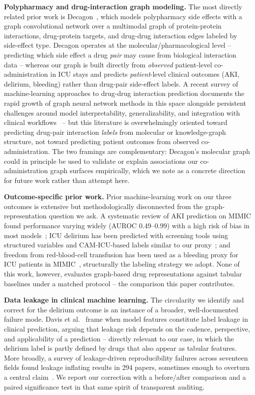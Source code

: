 \documentclass[conference]{IEEEtran}
\begin{document}
\textbf{Polypharmacy and drug-interaction graph modeling.} The most directly
related prior work is Decagon~\cite{zitnik2018decagon}, which models
polypharmacy side effects with a graph convolutional network over a
multimodal graph of protein-protein interactions, drug-protein targets, and
drug-drug interaction edges labeled by side-effect type. Decagon operates at
the molecular/pharmacological level -- predicting which side effect a drug
\emph{pair} may cause from biological interaction data -- whereas our graph
is built directly from \emph{observed} patient-level co-administration in
ICU stays and predicts \emph{patient}-level clinical outcomes (AKI,
delirium, bleeding) rather than drug-pair side-effect labels. A recent
survey of machine-learning approaches to drug-drug interaction prediction
documents the rapid growth of graph neural network methods in this space
alongside persistent challenges around model interpretability,
generalizability, and integration with clinical
workflows~\cite{lu2026ddisurvey} -- but this literature is overwhelmingly
oriented toward predicting drug-pair interaction \emph{labels} from
molecular or knowledge-graph structure, not toward predicting patient
outcomes from observed co-administration. The two framings are
complementary: Decagon's molecular graph could in principle be used to
validate or explain associations our co-administration graph surfaces
empirically, which we note as a concrete direction for future work rather
than attempt here.

\textbf{Outcome-specific prior work.} Prior machine-learning work on our
three outcomes is extensive but methodologically disconnected from the
graph-representation question we ask. A systematic review of AKI prediction
on MIMIC found performance varying widely (AUROC 0.49--0.99) with a high
risk of bias in most models~\cite{vagliano2022akireview}; ICU delirium has
been predicted with screening tools using structured variables and
CAM-ICU-based labels similar to our proxy~\cite{bhattacharyya2022delirium};
and freedom from red-blood-cell transfusion has been used as a bleeding
proxy for ICU patients in MIMIC~\cite{levi2021gibleeding}, structurally the
labeling strategy we adopt. None of this work, however, evaluates
graph-based drug representations against tabular baselines under a matched
protocol -- the comparison this paper contributes.

\textbf{Data leakage in clinical machine learning.} The circularity we
identify and correct for the delirium outcome is an instance of a broader,
well-documented failure mode. Davis et al.~\cite{davis2023labelleakage}
frame when model features constitute label leakage in clinical prediction,
arguing that leakage risk depends on the cadence, perspective, and
applicability of a prediction -- directly relevant to our case, in which
the delirium label is partly defined by drugs that also appear as tabular
features. More broadly, a survey of leakage-driven reproducibility failures
across seventeen fields found leakage inflating results in 294 papers,
sometimes enough to overturn a central claim~\cite{kapoor2023leakage}. We
report our correction with a before/after comparison and a paired
significance test in that same spirit of transparent auditing.
\end{document}
